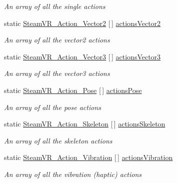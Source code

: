 \begin{DoxyCompactItemize}
\begin{DoxyCompactList}\small\item\em An array of all the single actions \end{DoxyCompactList}\item 
static \mbox{\hyperlink{class_valve_1_1_v_r_1_1_steam_v_r___action___vector2}{Steam\+V\+R\+\_\+\+Action\+\_\+\+Vector2}} \mbox{[}$\,$\mbox{]} \mbox{\hyperlink{class_valve_1_1_v_r_1_1_steam_v_r___input_a470c062f3b57842e415c127f0b3d8e30}{actions\+Vector2}}
\begin{DoxyCompactList}\small\item\em An array of all the vector2 actions \end{DoxyCompactList}\item 
static \mbox{\hyperlink{class_valve_1_1_v_r_1_1_steam_v_r___action___vector3}{Steam\+V\+R\+\_\+\+Action\+\_\+\+Vector3}} \mbox{[}$\,$\mbox{]} \mbox{\hyperlink{class_valve_1_1_v_r_1_1_steam_v_r___input_a6a25b2f5d1f958d75e18445b21043968}{actions\+Vector3}}
\begin{DoxyCompactList}\small\item\em An array of all the vector3 actions \end{DoxyCompactList}\item 
static \mbox{\hyperlink{class_valve_1_1_v_r_1_1_steam_v_r___action___pose}{Steam\+V\+R\+\_\+\+Action\+\_\+\+Pose}} \mbox{[}$\,$\mbox{]} \mbox{\hyperlink{class_valve_1_1_v_r_1_1_steam_v_r___input_a9b9ca9a53455596fcd7dd197aa892b40}{actions\+Pose}}
\begin{DoxyCompactList}\small\item\em An array of all the pose actions \end{DoxyCompactList}\item 
static \mbox{\hyperlink{class_valve_1_1_v_r_1_1_steam_v_r___action___skeleton}{Steam\+V\+R\+\_\+\+Action\+\_\+\+Skeleton}} \mbox{[}$\,$\mbox{]} \mbox{\hyperlink{class_valve_1_1_v_r_1_1_steam_v_r___input_aa5b9aa75ec82e6a6ab8b1e4198fd7445}{actions\+Skeleton}}
\begin{DoxyCompactList}\small\item\em An array of all the skeleton actions \end{DoxyCompactList}\item 
static \mbox{\hyperlink{class_valve_1_1_v_r_1_1_steam_v_r___action___vibration}{Steam\+V\+R\+\_\+\+Action\+\_\+\+Vibration}} \mbox{[}$\,$\mbox{]} \mbox{\hyperlink{class_valve_1_1_v_r_1_1_steam_v_r___input_a784d20fd1bef89b38a16349bee0c0ce1}{actions\+Vibration}}
\begin{DoxyCompactList}\small\item\em An array of all the vibration (haptic) actions \end{DoxyCompactList}\item 

\end{DoxyCompactItemize}
